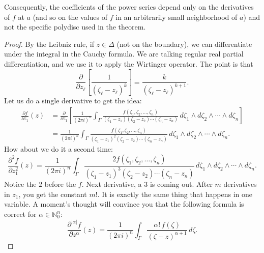 \documentclass[12pt,openany]{book}
\newcommand{\sabs}[1]{\lvert {#1} \rvert}
\newcommand{\N}{{\mathbb{N}}}
\theoremstyle{plain}
\theoremstyle{remark}
\theoremstyle{definition}
\theoremstyle{exercise}
\theoremstyle{example}
\begin{document}
Consequently, the coefficients of the power series depend only on
the derivatives of $f$ at $a$
(and so on the values of $f$ in an arbitrarily small
neighborhood of $a$) and not the specific polydisc used in the theorem.

\begin{proof}
By the Leibniz rule,
if $z \in \Delta$ (not on the boundary),
we can differentiate under the integral in the Cauchy formula.
We are talking regular real
partial differentiation, and we use it to apply the Wirtinger operator.
The point is that
\begin{equation*}
\frac{\partial}{\partial z_\ell} \left[
\frac{1}{{(\zeta_\ell-z_\ell)}^k} \right]
=
\frac{k}{{(\zeta_\ell-z_\ell)}^{k+1}} .
\end{equation*}
Let us do a single derivative to
get the idea:
\begin{equation*}
\begin{split}
\frac{\partial f}{\partial z_1}(z) &=
\frac{\partial}{\partial z_1} \left[
\frac{1}{{(2\pi i)}^n}
\int_{\Gamma}
\frac{f(\zeta_1,\zeta_2,\ldots,\zeta_n)}{(\zeta_1-z_1)(\zeta_2-z_2)\cdots(\zeta_n-z_n)}
\,
d \zeta_1
\wedge
d \zeta_2
\wedge
\cdots
\wedge
d \zeta_n
\right]
\\
& =
\frac{1}{{(2\pi i)}^n}
\int_{\Gamma}
\frac{f(\zeta_1,\zeta_2,\ldots,\zeta_n)}{{(\zeta_1-z_1)}^2(\zeta_2-z_2)\cdots(\zeta_n-z_n)}
\,
d \zeta_1
\wedge
d \zeta_2
\wedge
\cdots
\wedge
d \zeta_n .
\end{split}
\end{equation*}
How about we do it a second time:
\begin{equation*}
\frac{\partial^2 f}{\partial z_1^2}(z)
=
\frac{1}{{(2\pi i)}^n}
\int_{\Gamma}
\frac{2 f(\zeta_1,\zeta_2,\ldots,\zeta_n)}{{(\zeta_1-z_1)}^3(\zeta_2-z_2)\cdots(\zeta_n-z_n)}
\,
d \zeta_1
\wedge
d \zeta_2
\wedge
\cdots
\wedge
d \zeta_n .
\end{equation*}
Notice the $2$ before the $f$.  Next derivative, a $3$ is coming out.
After $m$ derivatives in $z_1$, you get the constant $m!$.
It is exactly the same thing that happens in one variable.  A moment's
thought will convince you that the following formula is correct for
$\alpha \in \N_0^n$:
\begin{equation*}
\frac{\partial^{\sabs{\alpha}}f}{\partial z^\alpha} (z) =
\frac{1}{{(2\pi i)}^n}
\int_{\Gamma}
\frac{\alpha! \, f(\zeta)}{{(\zeta-z)}^{\alpha+1}}
\,
d \zeta .
\end{equation*}


\end{proof}
\end{document}
